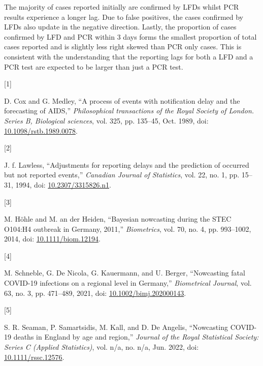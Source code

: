 \documentclass[
  a4paper,
]{article}
\newlength{\cslhangindent}
\newlength{\csllabelwidth}
\newlength{\cslentryspacingunit} %
\newenvironment{CSLReferences}[2] %
 {%
  \setlength{\parindent}{0pt}
  \ifodd #1
  \let\oldpar\par
  \def\par{\hangindent=\cslhangindent\oldpar}
  \fi
  \setlength{\parskip}{#2\cslentryspacingunit}
 }%
 {}
\newcommand{\CSLLeftMargin}[1]{\parbox[t]{\csllabelwidth}{#1}}
\newcommand{\CSLRightInline}[1]{\parbox[t]{\linewidth - \csllabelwidth}{#1}\break}
\begin{document}
The majority of cases reported initially are confirmed by LFDs whilst
PCR results experience a longer lag. Due to false positives, the cases
confirmed by LFDs also update in the negative direction. Lastly, the
proportion of cases confirmed by LFD and PCR within 3 days forms the
smallest proportion of total cases reported and is slightly less right
skewed than PCR only cases. This is consistent with the understanding
that the reporting lags for both a LFD and a PCR test are expected to be
larger than just a PCR test.

\hypertarget{refs}{}
\begin{CSLReferences}{0}{0}
\leavevmode{}%
\CSLLeftMargin{{[}1{]} }%
\CSLRightInline{D. Cox and G. Medley, {``A process of events with
notification delay and the forecasting of AIDS,''} \emph{Philosophical
transactions of the Royal Society of London. Series B, Biological
sciences}, vol. 325, pp. 135--45, Oct. 1989, doi:
\href{https://doi.org/10.1098/rstb.1989.0078}{10.1098/rstb.1989.0078}.}

\leavevmode{}%
\CSLLeftMargin{{[}2{]} }%
\CSLRightInline{J. f. Lawless, {``Adjustments for reporting delays and
the prediction of occurred but not reported events,''} \emph{Canadian
Journal of Statistics}, vol. 22, no. 1, pp. 15--31, 1994, doi:
\href{https://doi.org/10.2307/3315826.n1}{10.2307/3315826.n1}.}

\leavevmode{}%
\CSLLeftMargin{{[}3{]} }%
\CSLRightInline{M. Höhle and M. an der Heiden, {``Bayesian nowcasting
during the STEC O104:H4 outbreak in Germany, 2011,''} \emph{Biometrics},
vol. 70, no. 4, pp. 993--1002, 2014, doi:
\href{https://doi.org/10.1111/biom.12194}{10.1111/biom.12194}.}

\leavevmode{}%
\CSLLeftMargin{{[}4{]} }%
\CSLRightInline{M. Schneble, G. De Nicola, G. Kauermann, and U. Berger,
{``Nowcasting fatal COVID-19 infections on a regional level in
Germany,''} \emph{Biometrical Journal}, vol. 63, no. 3, pp. 471--489,
2021, doi:
\href{https://doi.org/10.1002/bimj.202000143}{10.1002/bimj.202000143}.}

\leavevmode{}%
\CSLLeftMargin{{[}5{]} }%
\CSLRightInline{S. R. Seaman, P. Samartsidis, M. Kall, and D. De
Angelis, {``Nowcasting COVID-19 deaths in England by age and region,''}
\emph{Journal of the Royal Statistical Society: Series C (Applied
Statistics)}, vol. n/a, no. n/a, Jun. 2022, doi:
\href{https://doi.org/10.1111/rssc.12576}{10.1111/rssc.12576}.}


\end{CSLReferences}
\end{document}
